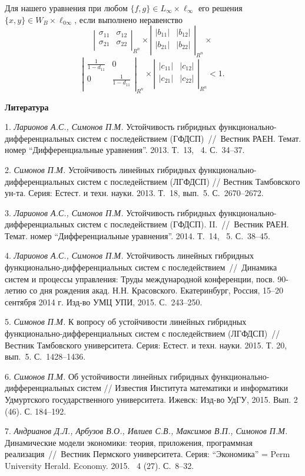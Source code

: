 Для нашего уравнения при любом $\{ f,g\} \in L_{\infty}\times \ell_{\infty}$ его решения $\{ x,y\} \in W_{B}\times \ell_{0\infty}$, если выполнено неравенство
$$
\left|\begin{array}{cc}
\sigma_{11} & \sigma_{12} \\
\sigma_{21} & \sigma_{22} \\
\end{array}\right|_{R^n} \times
\left|\begin{array}{cc}
|b_{11}| & |b_{12}| \\
|b_{21}| & |b_{22}| \\
\end{array}\right|_{R^n}\times
$$
$$
\left|\begin{array}{cc}
\frac{1}{1-d_{11}} & 0 \\
0        & \frac{1}{1-d_{11}} \\
\end{array}\right|_{R^n}\times
\left|\begin{array}{cc}
|c_{11}| & |c_{12}| \\
|c_{21}| & |c_{22}| \\
\end{array}\right|_{R^n} < 1.
$$


\smallskip \centerline {\bf Литература} \nopagebreak

1.
{\it Ларионов А.С., Симонов П.М.} Устойчивость гибридных функционально-дифференциальных систем с последействием (ГФДСП)~//~Вестник РАЕН. Темат. номер ``Дифференциальные уравнения''. 2013. Т.~13, \No~4. С.~34--37.

2.
{\it Симонов П.М.}	Устойчивость линейных гибридных фу\-н\-к\-ци\-о\-на\-ль\-но-ди\-ф\-фе\-рен\-ци\-аль\-ных систем с последействием (ЛГФДСП) // Вестник Тамбовского ун-та. Серия: Естест. и техн. науки. 2013. Т.~18, вып.~5. С.~2670--2672.


3.
{\it Ларионов А.С., Симонов П.М.} Устойчивость гибридных функционально-дифференциальных систем с последействием (ГФДСП). II.~//~Вестник РАЕН. Темат. номер ``Дифференциальные уравнения''. 2014. Т.~14, \No~5. С.~38--45.

4.
{\it Ларионов А.С., Симонов П.М.} Устойчивость линейных гибридных функционально-дифференциальных систем с последействием~//~Динамика систем и процессы управления: Труды международной конференции, посв. 90-летию со дня рождения акад. Н.Н. Красовского. Екатеринбург, Россия, 15--20 сентября 2014 г. Изд-во УМЦ УПИ, 2015. С.~243--250.

5.
{\it Симонов П.М.} К вопросу об устойчивости линейных гибридных функционально-дифференциальных систем с последействием (ЛГФДСП)~// Вестник Тамбовского университета. Серия: Естест. и техн. науки. 2015. Т. 20, вып.~5. С.~1428--1436.

6.
{\it Симонов П.М.} Об устойчивости линейных гибридных функционально-дифференциальных систем // Известия Института математики и информатики Удмуртского государственного университета. Ижевск: Изд-во УдГУ, 2015. Вып. 2 (46). С. 184--192.


7.
{\it Андрианов Д.Л., Арбузов В.О., Ивлиев С.В., Максимов В.П., Симонов П.М.} Динамические модели экономики: теория, приложения, программная реализация~//~Вестник Пермского университета. Серия: ``Экономика'' = Perm University Herald. Economy. 2015. \No~4 (27). С.~8--32.
